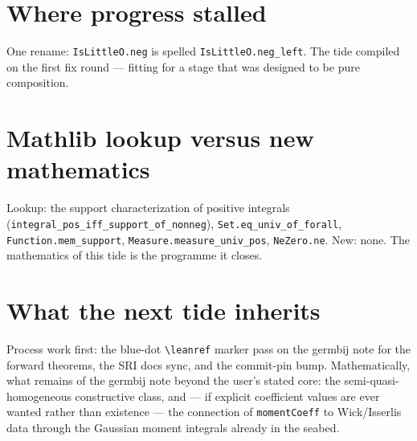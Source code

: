 \documentclass[11pt]{article}
\newcommand{\code}[1]{\texttt{#1}}
\begin{document}
\section{Where progress stalled}

\begin{sloppypar}
One rename: \code{IsLittleO.neg} is spelled
\code{IsLittleO.neg\_left}. The tide compiled on the first fix
round --- fitting for a stage that was designed to be pure
composition.
\end{sloppypar}

\section{Mathlib lookup versus new mathematics}

\begin{sloppypar}
Lookup: the support characterization of positive integrals
(\code{integral\_pos\_iff\_support\_of\_nonneg}),
\code{Set.eq\_univ\_of\_forall}, \code{Function.mem\_support},
\code{Measure.measure\_univ\_pos}, \code{NeZero.ne}. New: none. The
mathematics of this tide is the programme it closes.
\end{sloppypar}

\section{What the next tide inherits}

Process work first: the blue-dot \code{\textbackslash leanref} marker
pass on the germbij note for the forward theorems, the SRI docs sync,
and the commit-pin bump. Mathematically, what remains of the germbij
note beyond the user's stated core: the semi-quasi-homogeneous
constructive class, and --- if explicit coefficient values are ever
wanted rather than existence --- the connection of
\code{momentCoeff} to Wick/Isserlis data through the Gaussian moment
integrals already in the seabed.
\end{document}
